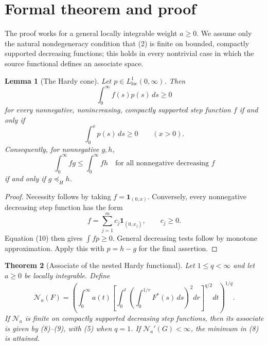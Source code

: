 \documentclass[11pt]{article}
\newtheorem{theorem}{Theorem}
\newtheorem{lemma}[theorem]{Lemma}
\newcommand{\N}{\mathcal N}
\begin{document}
\section*{Formal theorem and proof}

The proof works for a general locally integrable weight $a\ge0$.  We assume
only the natural nondegeneracy condition that (2) is finite on bounded,
compactly supported decreasing functions; this holds in every nontrivial
case in which the source functional defines an associate space.

\begin{lemma}[The Hardy cone]\label{lem:hardycone}
Let $p\in L^1_{\mathrm{loc}}(0,\infty)$.  Then
\[
 \int_0^\infty f(s)p(s)\,ds\ge0
\]
for every nonnegative, nonincreasing, compactly supported step function $f$
if and only if
\[
 \int_0^xp(s)\,ds\ge0\qquad(x>0).                              \tag{10}
\]
Consequently, for nonnegative $g,h$,
\[
 \int_0^\infty f g\le\int_0^\infty f h
 \quad\text{for all nonnegative decreasing }f
\]
if and only if $g\preccurlyeq_Hh$.
\end{lemma}

\begin{proof}
Necessity follows by taking $f=\mathbf1_{(0,x)}$.  Conversely, every
nonnegative decreasing step function has the form
\[
 f=\sum_{j=1}^m c_j\mathbf1_{(0,x_j)},\qquad c_j\ge0.
\]
Equation (10) then gives $\int fp\ge0$.  General decreasing tests follow by
monotone approximation.  Apply this with $p=h-g$ for the final assertion.
\end{proof}

\begin{theorem}[Associate of the nested Hardy functional]\label{thm:dual}
Let $1\le q<\infty$ and let $a\ge0$ be locally integrable.  Define
\[
 \N_a(F)=\left(\int_0^\infty a(t)
 \left[\int_0^t\left(\int_0^{1/r}F^*(s)\,ds\right)^2dr
 \right]^{q/2}dt\right)^{1/q}.
\]
If $\N_a$ is finite on compactly supported decreasing step functions, then
its associate is given by (8)--(9), with (5) when $q=1$.  If
$\N_a'(G)<\infty$, the minimum in (8) is attained.
\end{theorem}
\end{document}
